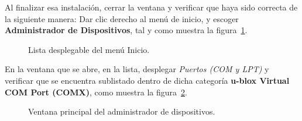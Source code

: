Al finalizar esa instalación, cerrar la ventana y verificar que haya sido correcta de la siguiente manera: Dar clic derecho al menú de inicio, y escoger \textbf{Administrador de Dispositivos}, tal y como muestra la figura~\ref{fig:startlist}.

\begin{figure}[H] %
\caption{Lista desplegable del menú Inicio.}
\label{fig:startlist}
\end{figure}

En la ventana que se abre, en la lista, desplegar \textit{Puertos (COM y LPT)} y verificar que se encuentra sublistado dentro de dicha categoría \textbf{u-blox Virtual COM Port (COMX)}, como muestra la figura~\ref{fig:admdisp}.

\begin{figure}[H] %
\caption{Ventana principal del administrador de dispositivos.}
\label{fig:admdisp}
\end{figure}

